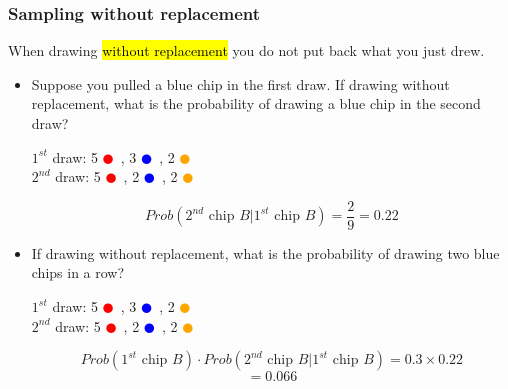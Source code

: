 \documentclass[slidestop,compress,mathserif]{beamer}
\begin{document}

\begin{frame}
\frametitle{Sampling without replacement}

When drawing \hl{without replacement} you do not put back what you just drew.

\begin{itemize}

\pause

\item Suppose you pulled a blue chip in the first draw. If drawing without replacement, what is the probability of drawing a blue chip in the second draw?
\pause
\begin{center}
$1^{st}$ draw: 5 \textcolor{red}{$\CIRCLE$}~, 3 \textcolor{blue}{$\CIRCLE$}~, 2 \textcolor{orange}{$\CIRCLE$} \\
\pause
$2^{nd}$ draw: 5 \textcolor{red}{$\CIRCLE$}~, 2 \textcolor{blue}{$\CIRCLE$}~, 2 \textcolor{orange}{$\CIRCLE$}
\end{center}
\pause
\[ Prob(2^{nd} \text{ chip } B | 1^{st} \text{ chip } B) = \frac{2}{9} = 0.22 \]

\pause

\item If drawing without replacement, what is the probability of drawing two blue chips in a row?
\begin{center}

\pause
$1^{st}$ draw: 5 \textcolor{red}{$\CIRCLE$}~, 3 \textcolor{blue}{$\CIRCLE$}~, 2 \textcolor{orange}{$\CIRCLE$} \\
$2^{nd}$ draw: 5 \textcolor{red}{$\CIRCLE$}~, 2 \textcolor{blue}{$\CIRCLE$}~, 2 \textcolor{orange}{$\CIRCLE$}
\end{center}
\pause
\[ Prob(1^{st} \text{ chip } B) \cdot Prob(2^{nd} \text{ chip } B | 1^{st} \text{ chip } B)  = 0.3 \times 0.22 \]
\[ = 0.066 \]

\end{itemize}

\end{frame}

\end{document}
